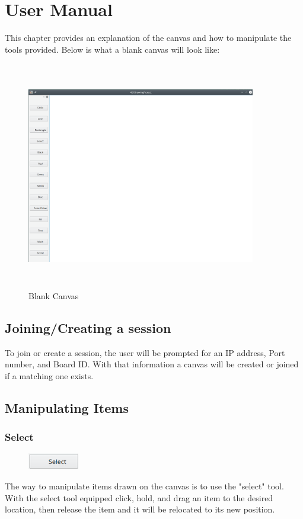 \chapter{User Manual}
This chapter provides an explanation of the canvas and how to manipulate the tools provided. Below is what a blank canvas will look like:
\begin{figure}[h!]
\centering
\includegraphics[height=10cm, width=10cm]{canvas}
\caption{Blank Canvas}
\end{figure}

\section{Joining/Creating a session}
To join or create a session, the user will be prompted for an IP address, Port number, and Board ID. With that information a canvas will be created or joined if a matching one exists.

\section{Manipulating Items}
\subsection{Select}
\begin{figure}[h!]
\includegraphics{select}
\end{figure}
  The way to manipulate items drawn on the canvas is to use the "select" tool. With the select tool equipped click, hold, and drag an item to the desired location, then release the item and it will be relocated to its new position.


